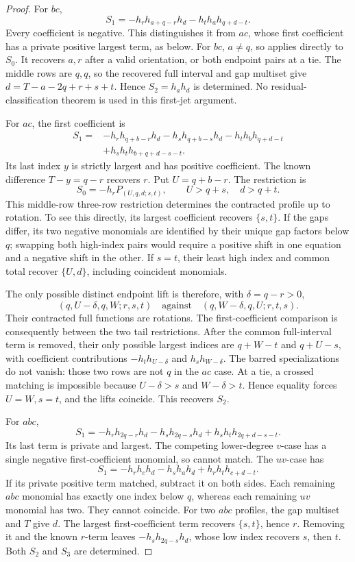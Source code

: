 \documentclass[11pt,a4paper]{amsart}
\numberwithin{equation}{section}
\theoremstyle{plain}
\theoremstyle{definition}
\begin{document}
\begin{proof}
For \(bc\),
\[
 S_1=-h_rh_{a+q-r}h_d-h_th_ah_{q+d-t}.
\]
Every coefficient is negative.  This distinguishes it from \(ac\),
whose first coefficient has a private positive largest term, as below.
For \(bc\), \(a\ne q\), so
 applies directly to \(S_0\).
It recovers \(a,r\) after a valid orientation, or both endpoint pairs
at a tie.  The middle rows are \(q,q\), so the recovered full interval
and gap multiset give \(d=T-a-2q+r+s+t\).  Hence
\(S_2=h_ah_d\) is determined.  No residual-classification theorem
is used in this first-jet argument.

For \(ac\), the first coefficient is
\begin{align*}
 S_1={}&-h_rh_{q+b-r}h_d-h_sh_{q+b-s}h_d
        -h_th_bh_{q+d-t}\\
       &+h_sh_th_{b+q+d-s-t}.
\end{align*}
Its last index \(y\) is strictly largest and has positive coefficient.
The known difference \(T-y=q-r\) recovers \(r\).  Put \(U=q+b-r\).
The restriction is
\[
 S_0=-h_rP_{(U,q,d;s,t)},\qquad U>q+s,\quad d>q+t.
\]
This middle-row three-row restriction determines the contracted profile
up to rotation.  To see this directly, its largest coefficient recovers
\(\{s,t\}\).  If the gaps differ, its two negative monomials are
identified by their unique gap factors below \(q\); swapping both
high-index pairs would require a positive shift in one equation and a
negative shift in the other.  If \(s=t\), their least high index and
common total recover \(\{U,d\}\), including coincident monomials.

The only possible distinct endpoint lift is therefore, with
\(\delta=q-r>0\),
\[
 (q,U-\delta,q,W;r,s,t)
 \quad\text{against}\quad
 (q,W-\delta,q,U;r,t,s).
\]
Their contracted full functions are rotations.  The first-coefficient
comparison is consequently between the two tail restrictions.  After
the common full-interval term is removed, their only possible largest
indices are \(q+W-t\) and \(q+U-s\), with coefficient contributions
\(-h_t h_{U-\delta}\) and \(h_s h_{W-\delta}\).
The barred specializations do not vanish: those two rows are not \(q\)
in the \(ac\) case.  At a tie, a crossed matching is impossible because
\(U-\delta>s\) and \(W-\delta>t\).  Hence equality forces
\(U=W,s=t\), and the lifts coincide.  This recovers \(S_2\).

For \(abc\),
\[
 S_1=-h_rh_{2q-r}h_d-h_sh_{2q-s}h_d
          +h_sh_th_{2q+d-s-t}.
\]
Its last term is private and largest.  The competing lower-degree
\(v\)-case has a single negative first-coefficient monomial, so cannot
match.  The \(uv\)-case has
\[
 S_1=-h_rh_ch_d-h_sh_ah_d+h_rh_th_{c+d-t}.
\]
If its private positive term matched, subtract it on both sides.
Each remaining \(abc\) monomial has exactly one index below \(q\),
whereas each remaining \(uv\) monomial has two.  They cannot coincide.
For two \(abc\) profiles, the gap multiset and \(T\) give \(d\).
The largest first-coefficient term recovers \(\{s,t\}\), hence \(r\).
Removing it and the known \(r\)-term leaves
\(-h_sh_{2q-s}h_d\), whose low index recovers \(s\), then \(t\).
Both \(S_2\) and \(S_3\) are determined.


\end{proof}
\end{document}
